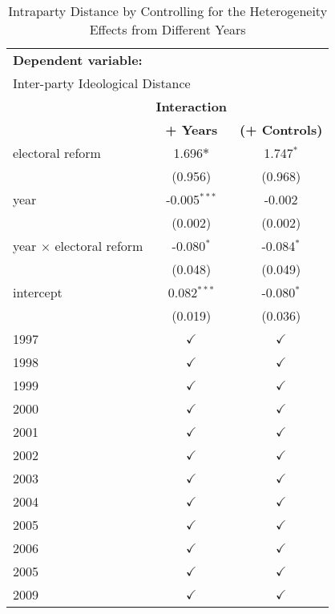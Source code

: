 \begin{table}[ht]
\caption{Intraparty Distance by Controlling for the Heterogeneity Effects from Different Years \label{tab:heterogeneity of bills-1}}
\centering{}%
\begin{tabular}{lcc}
\toprule 
\multicolumn{3}{l}{\textbf{Dependent variable:}}                                                            \tabularnewline
\multicolumn{3}{l}{\footnotesize{Inter-party Ideological Distance}}                                                        \tabularnewline
\midrule
                                & \footnotesize{\textbf{Interaction}} &                                      \tabularnewline
                                & \footnotesize{\textbf{+ Years}}     & \footnotesize{\textbf{(+ Controls)}} \tabularnewline
\midrule
\footnotesize{electoral reform} & \footnotesize{1.696$*$}       & \footnotesize{1.747$^{*}$}                \tabularnewline
                                & (0.956)                       & (0.968)                                   \tabularnewline
\footnotesize{year}             & \footnotesize{-0.005$^{***}$} & \footnotesize{-0.002}                     \tabularnewline
 & (0.002) & (0.002)\tabularnewline
\footnotesize{year $\times$ electoral reform}  & \footnotesize{-0.080$^{*}$} & \footnotesize{-0.084$^{*}$}  \tabularnewline
                                               & (0.048)                     & (0.049)                      \tabularnewline
\footnotesize{intercept}        & \footnotesize{0.082$^{***}$}  & \footnotesize{-0.080$^{*}$}               \tabularnewline
 & (0.019) & (0.036)\tabularnewline
\footnotesize{1997}             & $\checkmark$         & $\checkmark$  \tabularnewline
\footnotesize{1998}             & $\checkmark$         & $\checkmark$  \tabularnewline
\footnotesize{1999}             & $\checkmark$         & $\checkmark$  \tabularnewline
\footnotesize{2000}             & $\checkmark$         & $\checkmark$  \tabularnewline
\footnotesize{2001}             & $\checkmark$         & $\checkmark$  \tabularnewline
\footnotesize{2002}             & $\checkmark$         & $\checkmark$  \tabularnewline
\footnotesize{2003}             & $\checkmark$         & $\checkmark$  \tabularnewline
\footnotesize{2004}             & $\checkmark$         & $\checkmark$  \tabularnewline
\footnotesize{2005}             & $\checkmark$         & $\checkmark$  \tabularnewline
\footnotesize{2006}             & $\checkmark$         & $\checkmark$  \tabularnewline
\footnotesize{2005}             & $\checkmark$         & $\checkmark$  \tabularnewline
\footnotesize{2009}             & $\checkmark$         & $\checkmark$  \tabularnewline

\end{tabular}
\end{table}

